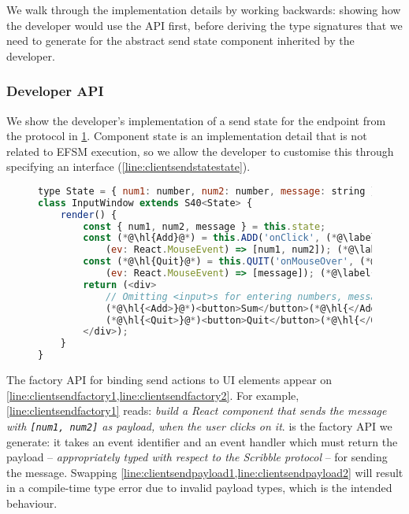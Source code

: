 We walk through the implementation details by working backwards:
showing how the developer would use the API first,
before deriving the type signatures that we need to
generate for the abstract send state component inherited by the developer.

\subsubsection{Developer API}

We show the developer's implementation 
of a send state for the  endpoint
from the  protocol in \cref{lst:adderclientsenddev}.
Component state is an implementation detail 
that is not related to EFSM execution, so we allow
the developer to customise this through specifying an 
interface (\cref{line:clientsendstatestate}).

\begin{figure}[!h]
\begin{lstlisting}[language=javascript,tabsize=2]
type State = { num1: number, num2: number, message: string }; (*@\label{line:clientsendstatestate}@*)
class InputWindow extends S40<State> {
	render() {
		const { num1, num2, message } = this.state;
		const (*@\hl{Add}@*) = this.ADD('onClick', (*@\label{line:clientsendfactory1}@*)
			(ev: React.MouseEvent) => [num1, num2]); (*@\label{line:clientsendpayload1}@*)
		const (*@\hl{Quit}@*) = this.QUIT('onMouseOver', (*@\label{line:clientsendfactory2}@*)
			(ev: React.MouseEvent) => [message]); (*@\label{line:clientsendpayload2}@*)
		return (<div>
			// Omitting <input>s for entering numbers, message
			(*@\hl{<Add>}@*)<button>Sum</button>(*@\hl{</Add>}@*)
			(*@\hl{<Quit>}@*)<button>Quit</button>(*@\hl{</Quit>}@*)
		</div>);
	}
}
\end{lstlisting}
\label{lst:adderclientsenddev}
\end{figure}

The factory API for binding send actions to UI elements appear on
\cref{line:clientsendfactory1,line:clientsendfactory2}.
For example, \cref{line:clientsendfactory1} reads: 
\textit{build a React component that sends the 
message with \texttt{[num1, num2]} as payload,
when the user clicks on it}.
 is the factory API we generate: it takes an event identifier
and an event handler which must return the payload 
-- \textit{appropriately typed with respect to the Scribble protocol} -- 
for sending the  message.
Swapping \cref{line:clientsendpayload1,line:clientsendpayload2}
will result in a compile-time type error due to invalid 
payload types, which is the intended behaviour.


